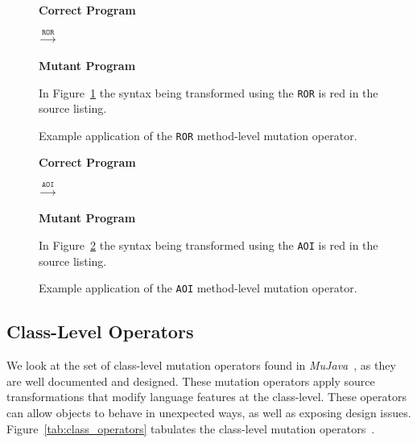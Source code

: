 \begin{figure}[h]
  \centering
  \begin{minipage}{6.5cm}
  \centering
  \footnotesize{\textbf{Correct Program}}
  
  \end{minipage}
  $\xrightarrow{\texttt{ROR}}$
  \begin{minipage}{6.5cm}
  \centering
  \footnotesize{\textbf{Mutant Program}}
  
  \end{minipage}
  \caption{Example application of the \texttt{ROR} method-level mutation operator.}
  \vspace{1mm}
  \footnotesize{In Figure~\ref{fig:ROR_mutation} the syntax being transformed using the \texttt{ROR} is red in the source listing.}
  \vspace{1mm}
  \label{fig:ROR_mutation}
\end{figure}

\begin{figure}[h]
  \centering
  \begin{minipage}{6.5cm}
  \centering
  \footnotesize{\textbf{Correct Program}}
  
  \end{minipage}
  $\xrightarrow{\texttt{AOI}}$
  \begin{minipage}{6.5cm}
  \centering
  \footnotesize{\textbf{Mutant Program}}
  
  \end{minipage}
  \caption{Example application of the \texttt{AOI} method-level mutation operator.}
  \vspace{1mm}
  \footnotesize{In Figure~\ref{fig:AOI_mutation} the syntax being transformed using the \texttt{AOI} is red in the source listing.}
  \vspace{1mm}
  \label{fig:AOI_mutation}
\end{figure}


\subsection{Class-Level Operators}
\label{subsec:background_class_operators}
We look at the set of class-level mutation operators found in \emph{MuJava}~\cite{MOK05, MKO02}, as they are well documented and designed. These mutation operators apply source transformations that modify language features at the class-level. These operators can allow objects to behave in unexpected ways, as well as exposing design issues. Figure~\ref{tab:class_operators} tabulates the class-level mutation operators~\cite{MO05b}.

